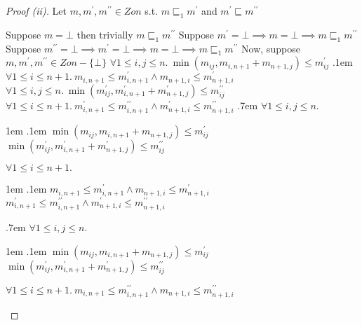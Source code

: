 \begin{prop}
  \begin{proof}[Proof (ii)]
    Let $m,m^\prime,m^{\prime\prime}\in\mathit{Zon}$ s.t. $m\sqsubseteq_1m^\prime$ and $m^\prime\sqsubseteq m^{\prime\prime}$
    \begin{itemize}
      \step Suppose $m = \bot$ then trivially $m\sqsubseteq_1m^{\prime\prime}$
      \step Suppose $m^\prime = \bot\implies m=\bot\implies m\sqsubseteq_1m^{\prime\prime}$
      \step Suppose $m^{\prime\prime} = \bot\implies m^\prime=\bot\implies m=\bot\implies m\sqsubseteq_1m^{\prime\prime}$
      \step Now, suppose $m,m^\prime,m^{\prime\prime}\in\mathit{Zon}-\{\bot\}$
      \step[\imps] $\forall1\leq i,j\leq n.~\min(m_{ij},m_{i,n+1}+m_{n+1,j}) \leq m^\prime_{ij}$
      \itemsep.1em
      \step[\wedge] $\forall1\leq i \leq n+1.~ m_{i,n+1} \leq m^\prime_{i,n+1}\wedge m_{n+1,i}\leq m^\prime_{n+1,i}$
      \step[\wedge] $\forall1\leq i,j\leq n.~\min(m^\prime_{ij},m^\prime_{i,n+1}+m^\prime_{n+1,j}) \leq m^{\prime\prime}_{ij}$
      \step[\wedge] $\forall1\leq i \leq n+1.~ m^\prime_{i,n+1} \leq m^{\prime\prime}_{i,n+1}\wedge m^\prime_{n+1,i}\leq m^{\prime\prime}_{n+1,i}$
      \itemsep.7em
      \step[\imps] $\forall1\leq i,j\leq n.$
      \begin{itemize}
        \itemindent1em
        \itemsep.1em
        \step $\min(m_{ij},m_{i,n+1}+m_{n+1,j}) \leq m^\prime_{ij}$
        \step[\wedge] $\min(m^\prime_{ij},m^\prime_{i,n+1}+m^\prime_{n+1,j}) \leq m^{\prime\prime}_{ij}$
      \end{itemize}
      \step[\wedge] $\forall1\leq i \leq n+1.$
      \begin{itemize}
        \itemindent1em
        \itemsep.1em
        \step $m_{i,n+1} \leq m^\prime_{i,n+1}\wedge m_{n+1,i}\leq m^\prime_{n+1,i}$
        \step[\wedge] $m^\prime_{i,n+1} \leq m^{\prime\prime}_{i,n+1}\wedge m^\prime_{n+1,i}\leq m^{\prime\prime}_{n+1,i}$
      \end{itemize}
      \itemsep.7em
      \step[\imps] $\forall1\leq i,j\leq n.$
      \begin{itemize}
        \itemindent1em
        \itemsep.1em
        \step $\min(m_{ij},m_{i,n+1}+m_{n+1,j}) \leq m^\prime_{ij}$
        \step[\wedge] $\min(m^\prime_{ij},m^\prime_{i,n+1}+m^\prime_{n+1,j}) \leq m^{\prime\prime}_{ij}$
      \end{itemize}
      \step[\wedge] $\forall1\leq i \leq n+1.~m_{i,n+1} \leq m^{\prime\prime}_{i,n+1}\wedge m_{n+1,i}\leq m^{\prime\prime}_{n+1,i}$

\end{itemize}
\end{proof}
\end{prop}
